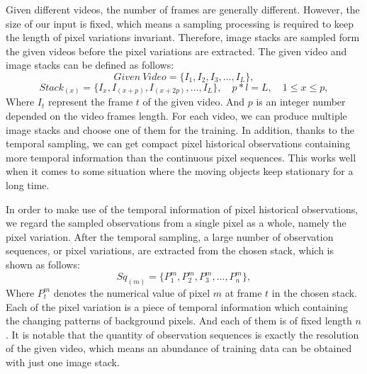\documentclass[journal]{IEEEtran}
\begin{document}
Given different videos, the number of frames are generally different. 
However, the size of our input is fixed, which means a sampling processing is required to keep the length of pixel variations invariant. 
Therefore, image stacks are sampled form the given videos before the pixel variations are extracted. 
The given video and image stacks can be defined as follows: 
\begin{equation}
	Given \  Video=\{ I_1,I_2,I_3,\dots,I_L\} ,
\end{equation}
\begin{equation}
Stack_{(x)}=\{I_x,I_{(x+p)},I_{(x+2p)},\dots,I_L \},\quad p*l=L,\quad 1\leq   x\leq p , 
\end{equation}
Where $I_t$ represent the frame $t$ of the given video. 
And $p$ is an integer number depended on the video frames length. 
For each video, we can produce multiple image stacks and choose one of them for the training. 
In addition, thanks to the temporal sampling, we can get compact pixel historical observations containing more temporal information than the continuous pixel sequences. 
This works well when it comes to some situation where the moving objects keep stationary for a long time. 


In order to make use of the temporal information of pixel historical observations, we regard the sampled observations from a single pixel as a whole, namely the pixel variation. 
After the temporal sampling, a large number of observation sequences, or pixel variations, are extracted from the chosen stack, which is shown as follows:
\begin{equation}
Sq_{(m)}=\{P_1^m,P_2^m,P_3^m,\dots,P_n^m\},
\end{equation}
Where $P_t^m$ denotes the numerical value of pixel $m$ at frame $t$ in the chosen stack. 
Each of the pixel variation is a piece of temporal information which containing the changing patterns of background pixels. 
And each of them is of fixed length $n$. 
It is notable that the quantity of observation sequences is exactly the resolution of the given video, which means an abundance of training data can be obtained with just one image stack. 
\end{document}
